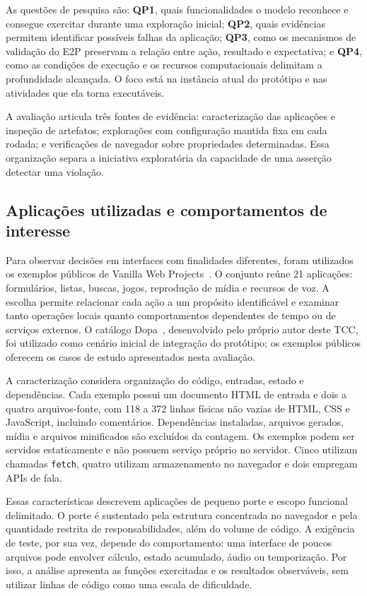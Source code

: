 \documentclass[12pt]{article}
\begin{document}
As questões de pesquisa são: \textbf{QP1}, quais funcionalidades o modelo reconhece e consegue exercitar durante uma exploração inicial; \textbf{QP2}, quais evidências permitem identificar possíveis falhas da aplicação; \textbf{QP3}, como os mecanismos de validação do E2P preservam a relação entre ação, resultado e expectativa; e \textbf{QP4}, como as condições de execução e os recursos computacionais delimitam a profundidade alcançada. O foco está na instância atual do protótipo e nas atividades que ela torna executáveis.

A avaliação articula três fontes de evidência: caracterização das aplicações e inspeção de artefatos; explorações com configuração mantida fixa em cada rodada; e verificações de navegador sobre propriedades determinadas. Essa organização separa a iniciativa exploratória da capacidade de uma asserção detectar uma violação.

\subsection{Aplicações utilizadas e comportamentos de interesse}
Para observar decisões em interfaces com finalidades diferentes, foram utilizados os exemplos públicos de Vanilla Web Projects~\cite{traversy2026vanilla}. O conjunto reúne 21 aplicações: formulários, listas, buscas, jogos, reprodução de mídia e recursos de voz. A escolha permite relacionar cada ação a um propósito identificável e examinar tanto operações locais quanto comportamentos dependentes de tempo ou de serviços externos. O catálogo Dopa~\cite{pieceofhell2026dopa}, desenvolvido pelo próprio autor deste TCC, foi utilizado como cenário inicial de integração do protótipo; os exemplos públicos oferecem os casos de estudo apresentados nesta avaliação.

A caracterização considera organização do código, entradas, estado e dependências. Cada exemplo possui um documento HTML de entrada e dois a quatro arquivos-fonte, com 118 a 372 linhas físicas não vazias de HTML, CSS e JavaScript, incluindo comentários. Dependências instaladas, arquivos gerados, mídia e arquivos minificados são excluídos da contagem. Os exemplos podem ser servidos estaticamente e não possuem serviço próprio no servidor. Cinco utilizam chamadas \texttt{fetch}, quatro utilizam armazenamento no navegador e dois empregam APIs de fala.

Essas características descrevem aplicações de pequeno porte e escopo funcional delimitado. O porte é sustentado pela estrutura concentrada no navegador e pela quantidade restrita de responsabilidades, além do volume de código. A exigência de teste, por sua vez, depende do comportamento: uma interface de poucos arquivos pode envolver cálculo, estado acumulado, áudio ou temporização. Por isso, a análise apresenta as funções exercitadas e os resultados observáveis, sem utilizar linhas de código como uma escala de dificuldade.
\end{document}
